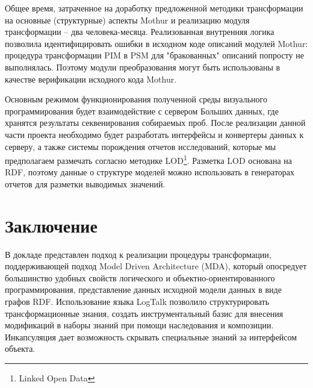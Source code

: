 \documentclass[conference]{IEEEtran} \IEEEoverridecommandlockouts
\begin{document}
Общее время, затраченное на доработку предложенной методики трансформации на основные (структурные) аспекты Mothur и реализацию модуля трансформации -- два человека-месяца. Реализованная внутренняя логика позволила идентифицировать ошибки в исходном коде описаний модулей Mothur: процедура трансформации PIM в PSM для "бракованных" описаний попросту не выполнялась. Поэтому модули преобразования могут быть использованы в качестве верификации исходного кода Mothur. 

Основным режимом функционирования полученной среды визуального программирования будет взаимодействие с сервером Больших данных, где хранятся результаты секвенирования собираемых проб.  После реализации данной части проекта необходимо будет разработать интерфейсы и конвертеры данных к серверу, а также системы порождения отчетов исследований, которые мы предполагаем размечать согласно методике LOD\footnote{Linked Open Data}. Разметка LOD основана на RDF, поэтому данные о структуре моделей можно использовать в генераторах отчетов для разметки выводимых значений. 

\section{Заключение} 

В докладе представлен подход к реализации процедуры трансформации, поддерживающей подход Model Driven Architecture (MDA), который опосредует большинство удобных свойств логического и объектно-ориентированного программирования, представление данных исходной модели данных в виде графов RDF. Использование языка LogTalk позволило структурировать трансформационные знания, создать инструментальный базис для внесения модификаций в наборы знаний при помощи наследования и композиции. Инкапсуляция дает возможность скрывать специальные знаний за интерфейсом объекта. 
\end{document}

